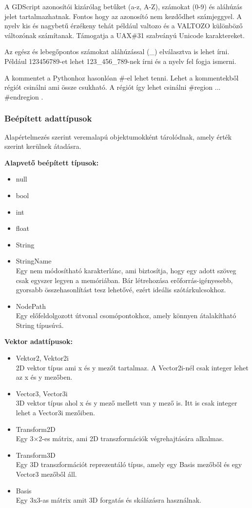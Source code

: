 \documentclass[
]{thesis-ekf}
\theoremstyle{definition}
\theoremstyle{remark}
\begin{document}
A GDScript azonosítói kizárólag betűket (a-z, A-Z), számokat (0-9) és aláhúzás jelet tartalmazhatnak. Fontos hogy az azonosító nem kezdődhet számjeggyel. A nyelv kis és nagybetű érzékeny tehát például valtozo és a VALTOZO különböző változónak számítanak. Támogatja a  UAX\#31 szabványú Unicode karaktereket.

Az egész és lebegőpontos számokat aláhúzással (\_) elválasztva is lehet írni. Például 123456789-et lehet 123\_456\_789-nek írni és a nyelv fel fogja ismerni.

A kommentet a Pythonhoz hasonlóan \#-el lehet tenni. Lehet a kommentekből régiót csinálni ami össze csukható. A régiót így lehet csinálni \#region ... \#endregion \cite{GDScript}.

\subsubsection*{Beépített adattípusok}
Alapértelmezés szerint veremalapú objektumokként tárolódnak, amely érték szerint kerülnek átadásra.

\textbf{Alapvető beépített típusok:}
\begin{itemize}
	\item null
	\item bool
	\item int
	\item float
	\item String
	\item StringName \\ Egy nem módosítható karakterlánc, ami biztosítja, hogy egy adott szöveg csak egyszer legyen a memóriában. Bár létrehozása erőforrás-igényesebb, gyorsabb összehasonlítást tesz lehetővé, ezért ideális szótárkulcsokhoz.
	\item NodePath \\ Egy előfeldolgozott útvonal csomópontokhoz, amely könnyen átalakítható String típusúvá. 
\end{itemize}
\textbf{Vektor adattípusok:}
\begin{itemize}
	\item Vektor2, Vektor2i \\ 2D vektor típus ami x és y mezőt tartalmaz. A Vector2i-nél csak integer lehet az x és y mezőben.
	\item Vector3, Vector3i \\ 3D vektor típus ahol x és y mező mellett van y mező is. Itt is csak integer lehet a Vector3i mezőiben.
	\item Transform2D \\ Egy 3×2-es mátrix, ami 2D transzformációk végrehajtására alkalmas. 
	\item Transform3D \\ Egy 3D transzformációt reprezentáló típus, amely egy Basis mezőből és egy Vector3 mezőből áll.
	\item Basis \\ Egy 3x3-as mátrix amit 3D forgatás és skálázásra használnak.
\end{itemize}
\end{document}
